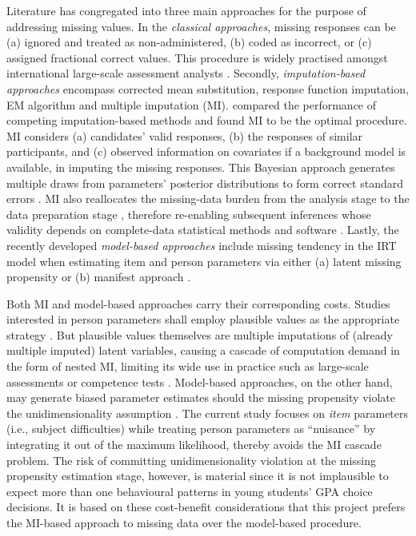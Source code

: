 Literature has congregated into three main approaches for the purpose of addressing missing values. In the \emph{classical approaches}, missing responses can be (a) ignored and treated as non-administered, (b) coded as incorrect, or (c) assigned fractional correct values. This procedure is widely practised amongst international large-scale assessment analysts \parencite{pohl:2014}. Secondly, \emph{imputation-based approaches} encompass corrected mean substitution, response function imputation, EM algorithm and multiple imputation (MI). \textcite{finch:2008} compared the performance of competing imputation-based methods and found MI to be the optimal procedure. MI considers (a) candidates' valid responses, (b) the responses of similar participants, and (c) observed information on covariates if a background model is available, in imputing the missing responses. This Bayesian approach generates multiple draws from parameters' posterior distributions to form correct standard errors \parencite{carpenter:2013}. MI also reallocates the missing-data burden from the analysis stage to the data preparation stage \parencite{reiter:2007}, therefore re-enabling subsequent inferences whose validity depends on complete-data statistical methods and software \parencite[][Chapter 4]{rubin:1987}. Lastly, the recently developed \emph{model-based approaches} include missing tendency in the IRT model when estimating item and person parameters via either (a) latent missing propensity \parencite{holman:2005, glas:2008, glas:2015,korobko:2008} or (b) manifest approach \parencite{rose:2010}.

Both MI and model-based approaches carry their corresponding costs. Studies interested in person parameters shall employ plausible values as the appropriate strategy \parencite{mislevy:1991,mislevy:1993}. But plausible values themselves are multiple imputations of (already multiple imputed) latent variables, causing a cascade of computation demand in the form of nested MI, limiting its wide use in practice such as large-scale assessments or competence tests \parencite{pohl:2014}. Model-based approaches, on the other hand, may generate biased parameter estimates should the missing propensity violate the unidimensionality assumption \parencite{rose:2013}. The current study focuses on \emph{item} parameters (i.e., subject difficulties) while treating person parameters as ``nuisance'' by integrating it out of the maximum likelihood, thereby avoids the MI cascade problem. The risk of committing unidimensionality violation at the missing propensity estimation stage, however, is material since it is not implausible to expect more than one behavioural patterns in young students' GPA choice decisions. It is based on these cost-benefit considerations that this project prefers the MI-based approach to missing data over the model-based procedure.